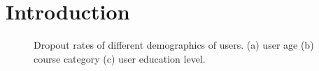 \section{Introduction}
\begin{figure}[h]
	\centering
	\caption{Dropout rates of different demographics of users. (a) user age (b) course category (c) user education level.}%
	\label{fig:dropStat} %
\end{figure}

